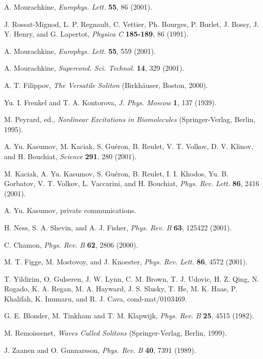 \begin{references}
 A. Mourachkine, {\it Europhys. Lett.} {\bf 55}, 86 (2001).

 J. Rossat-Mignod, L. P. Regnault, C. Vettier, Ph. Bourges,
P. Burlet, J. Bossy, J. Y. Henry, and G. Lapertot, {\it Physica C}
{\bf 185-189}, 86 (1991). 

 A. Mourachkine, {\it Europhys. Lett.} {\bf 55}, 559 
(2001).

 A. Mourachkine, {\it Supercond. Sci. Technol.} {\bf 14}, 
329 (2001).

 A. T. Filippov, {\it The Versatile Soliton} (Birkh\"{a}user,
Boston, 2000).

 Yu. I. Frenkel and T. A. Kontorova, {\it J. Phys. Moscow} 
{\bf 1}, 137 (1939).

 M. Peyrard, ed., {\it Nonlinear Excitations in Biomolecules}
(Springer-Verlag, Berlin, 1995).

 A. Yu. Kasumov, M. Kaciak, S. Gu\'{e}ron, B. Reulet, 
V. T. Volkov, D. V. Klinov, and H. Bouchiat, {\it Science} {\bf 291}, 280 (2001).

 M. Kaciak, A. Yu. Kasumov, S. Gu\'{e}ron, B. Reulet, 
I. I. Khodos, Yu. B. Gorbatov, V. T. Volkov, L. Vaccarini, and H. Bouchiat, 
{\it Phys. Rev. Lett.} {\bf 86}, 2416 (2001).

 A. Yu. Kasumov, private communications.

 H. Ness, S. A. Shevin, and A. J. Fisher, {\it Phys. Rev. B}
{\bf 63}, 125422 (2001).

 C. Chamon, {\it Phys. Rev. B} {\bf 62}, 2806 (2000).

 M. T. Figge, M. Mostovoy, and J. Knoester, 
{\it Phys. Rev. Lett.} {\bf 86}, 4572 (2001).

 T. Yildirim, O. Gulseren, J. W. Lynn, C. M. Brown, 
T. J. Udovic, H. Z. Qing, N. Rogado, K. A. Regan, M. A. Hayward, J. S. Slusky, 
T. He, M. K. Haas, P. Khalifah, K. Inumaru, and R. J. Cava, cond-mat/0103469.

 G. E. Blonder, M. Tinkham and T. M. Klapwijk, {\it Phys. Rev. B} 
{\bf 25}, 4515 (1982).

 M. Remoissenet, {\it Waves Called Solitons} 
(Springer-Verlag, Berlin, 1999).

 J. Zaanen and O. Gunnarsson, {\it Phys. Rev. B} {\bf 40},
7391 (1989).


\end{references}
